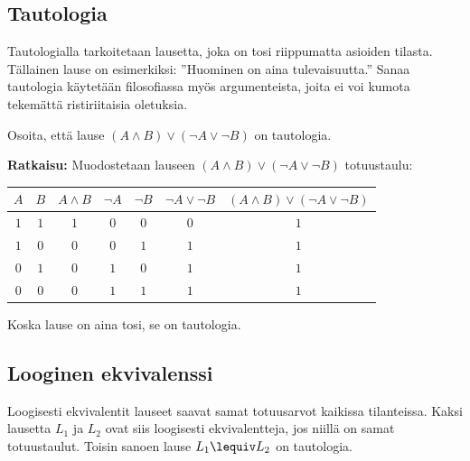 \subsection*{Tautologia}
Tautologialla tarkoitetaan lausetta, joka on tosi riippumatta asioiden tilasta. Tällainen lause on esimerkiksi: ''Huominen on aina tulevaisuutta.'' Sanaa tautologia käytetään filosofiassa myös argumenteista, joita ei voi kumota tekemättä ristiriitaisia oletuksia.

\begin{esimerkki}
Osoita, että lause $(A\land B)\lor (\lnot A \lor \lnot B)$ on
tautologia.

{\bf Ratkaisu:}
Muodostetaan lauseen $(A\land B)\lor (\lnot A \lor \lnot
B)$ totuustaulu:

\begin{center}
\begin{tabular}{|c|c|c|c|c|c|c|}\hline
$A$ & $B$ & $A\land B$ & $\lnot A$ & $\lnot B$ & $ \lnot
A \lor \lnot B $ & $(A\land B)\lor (\lnot A \lor \lnot B)$
\\ \hline
$1$ & $1$ & $1$ & $0$ & $0$ & $0$ & $1$ \\ %
$1$ & $0$ & $0$ & $0$ & $1$ & $1$ & $1$ \\
$0$ & $1$ & $0$ & $1$ & $0$ & $1$ & $1$ \\
$0$ & $0$ & $0$ & $1$ & $1$ & $1$ & $1$ \\ \hline
\end{tabular}
\end{center}

Koska lause on aina tosi, se on tautologia.
\end{esimerkki}

\subsection*{Looginen ekvivalenssi}  Loogisesti
ekvivalentit lauseet saavat samat totuusarvot
kaikissa tilanteissa. Kaksi lausetta $L_1$ ja
$L_2$ ovat siis  loogisesti ekvivalentteja, jos niillä
on samat totuustaulut. Toisin sanoen lause $L_1 \lequiv L_2$ on tautologia.

